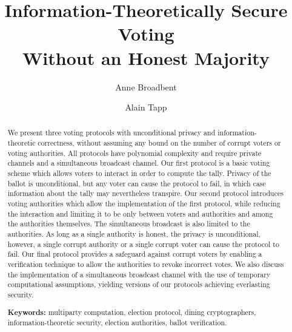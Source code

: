 \documentclass[runningheads]{llncs}
\begin{document}
\title{Information-Theoretically Secure Voting\\
Without an Honest Majority}

\author{Anne Broadbent  \and   Alain Tapp}














\maketitle

\begin{abstract}
We present three voting protocols with unconditional privacy and
information-theoretic correctness, without assuming any bound on the
number of corrupt voters or voting authorities. All protocols have
polynomial complexity and require private channels and a
simultaneous broadcast channel. Our first protocol is a basic voting
scheme which allows voters to interact in order to compute the
tally. Privacy of the ballot is unconditional, but any voter can
cause the protocol to fail, in which case information about the
tally may nevertheless transpire. Our second protocol introduces
voting authorities which allow the implementation of the first
protocol, while reducing the interaction and limiting it to be only
between voters and authorities and among the authorities themselves.
The simultaneous broadcast is also limited to the authorities.
 As long as a single authority is honest,
the privacy is unconditional, however, a single corrupt authority or
a single corrupt voter can cause the protocol to fail. Our final
protocol provides a safeguard against corrupt voters by enabling a
verification technique to allow the authorities to revoke
incorrect votes.
We also discuss the implementation of a simultaneous broadcast
channel with the use of temporary computational assumptions,
yielding versions of our protocols achieving  everlasting security.  \\
\smallskip

\textbf{Keywords:} multiparty computation, election protocol,
dining cryptographers, information-theoretic security, election
authorities, ballot verification.
\end{abstract}
\end{document}
